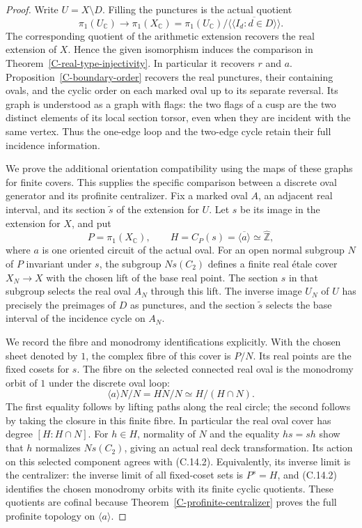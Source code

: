 \documentclass[11pt,oneside]{article}
\begin{document}
\begin{proof}
Write $U=X\setminus D$. Filling the punctures is the actual quotient
\[
 \pi_1(U_{\mathbb C})\longrightarrow\pi_1(X_{\mathbb C})
 =\pi_1(U_{\mathbb C})/
       \overline{\langle\!\langle I_d:d\in D\rangle\!\rangle}.
\tag{C.14.1}
\]
The corresponding quotient of the arithmetic extension recovers
the real extension of $X$. Hence the given isomorphism induces the
comparison in Theorem~\ref{C-real-type-injectivity}. In particular it
recovers $r$ and $a$. Proposition~\ref{C-boundary-order} recovers
the real punctures, their containing ovals, and the cyclic order
on each marked oval up to its separate reversal. Its graph is
understood as a graph with flags: the two flags of a cusp are the
two distinct elements of its local section torsor, even when they
are incident with the same vertex. Thus the one-edge loop and the
two-edge cycle retain their full incidence information.

We prove the additional orientation compatibility using the maps
of these graphs for finite covers. This supplies the specific
comparison between a discrete oval generator and its profinite
centralizer. Fix a marked oval $A$, an adjacent real interval,
and its section $\widetilde s$ of the extension for $U$. Let $s$
be its image in the extension for $X$, and put
\[
 P=\pi_1(X_{\mathbb C}),\qquad H=C_P(s)
       =\overline{\langle a\rangle}\simeq\widehat{\mathbb Z},
\]
where $a$ is one oriented circuit of the actual oval.
For an open normal subgroup $N$ of $P$ invariant under $s$, the
subgroup $N s(C_2)$ defines a finite real \'etale cover $X_N\to X$
with the chosen lift of the base real point. The section $s$ in
that subgroup selects the real oval $A_N$ through this lift.
The inverse image $U_N$ of $U$ has precisely the preimages of $D$
as punctures, and the section $\widetilde s$ selects the base
interval of the incidence cycle on $A_N$.

We record the fibre and monodromy identifications explicitly.
With the chosen sheet denoted by $1$, the complex fibre of this
cover is $P/N$. Its real points are the fixed cosets for $s$.
The fibre on the selected connected real oval is the monodromy
orbit of $1$ under the discrete oval loop:
\[
 \langle a\rangle N/N=HN/N\simeq H/(H\cap N).
\tag{C.14.2}
\]
The first equality follows by lifting paths along the real circle;
the second follows by taking the closure in this finite fibre.
In particular the real oval cover has degree
$[H:H\cap N]$. For $h\in H$, normality of $N$ and the equality
$hs=sh$ show that $h$ normalizes $Ns(C_2)$, giving an actual
real deck transformation. Its action on this selected component
agrees with (C.14.2). Equivalently,
its inverse limit is the centralizer: the inverse limit of all
fixed-coset sets is $P^s=H$, and (C.14.2) identifies the chosen
monodromy orbits with its finite cyclic quotients. These quotients
are cofinal because Theorem~\ref{C-profinite-centralizer} proves
the full profinite topology on $\langle a\rangle$.


\end{proof}
\end{document}
